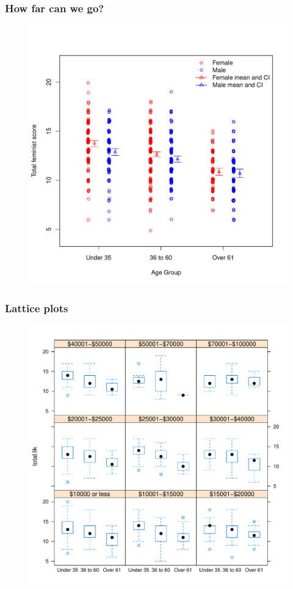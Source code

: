 \documentclass{beamer}\usepackage[]{graphicx}\usepackage[]{color}
\begin{document}
\begin{frame}[fragile]
  \frametitle{How far can we go?}

\begin{figure}[h]
  \vspace{-20pt}
  \centering
  \includegraphics[height = 0.7\textwidth, keepaspectratio]{Figure/oth1}
  \label{fig:oth1}
\end{figure}
\end{frame} 


\begin{frame}[fragile]
  \frametitle{Lattice plots}

\begin{figure}[h]
  \vspace{-20pt}
  \centering
  \includegraphics[height = 0.7\textwidth, keepaspectratio]{Figure/oth2}
  \label{fig:oth2}
\end{figure}
\end{frame} 
\end{document}
